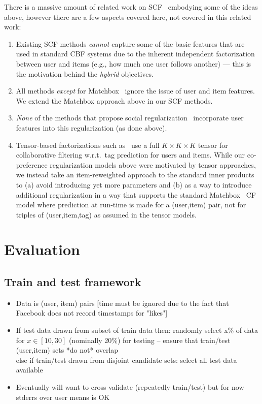 \documentclass{sig-alternate}
\begin{document}
There is a massive amount of related work on 
SCF~\cite{matchbox,ste,lla,glfm,tf,sorec,sr,rrmf,bisim,socinf} embodying some of the
ideas above, however there are a few aspects covered here, not covered
in this related work:
\begin{enumerate}
\item Existing SCF methods \emph{cannot} capture some of the basic features that are used in standard CBF systems due to the inherent independent factorization between user and items (e.g., how much one user follows another) --- this is the motivation behind the \emph{hybrid} objectives.
\item All methods \emph{except} for Matchbox~\cite{matchbox} ignore the issue of user and item features.  We extend the Matchbox approach above in our SCF methods. 
\item \emph{None} of the methods that propose social regularization~\cite{ste,sr,rrmf,lla,glfm,socinf} incorporate user features into this regularization (as done above).
\item Tensor-based factorizations such as~\cite{tf} use a full $K \times K \times K$ tensor for collaborative filtering w.r.t.\ tag prediction for users and items.  While our co-preference regularization models above were motivated by tensor approaches, we instead take an item-reweighted approach to the standard inner products to (a) avoid introducing yet more parameters and (b) as a way to introduce additional regularization in a way that supports the standard Matchbox~\cite{matchbox} CF model where prediction at run-time is made for a (user,item) pair, not for triples of (user,item,tag) as assumed in the tensor models.
\end{enumerate}

\section{Evaluation}

\subsection{Train and test framework}

\begin{itemize}
\item Data is (user, item) pairs [time must be ignored due to the fact that Facebook does not record timestamps for "likes"]
\item If test data drawn from subset of train data 
then: randomly select x\% of data for $x \in [10,30]$ (nominally 20\%) for testing -- ensure that train/test (user,item) sets *do not* overlap\\
else if train/test drawn from disjoint candidate sets: select all test data available\item Eventually will want to cross-validate (repeatedly train/test) but for now stderrs over user means is OK
\end{itemize}
\end{document}
